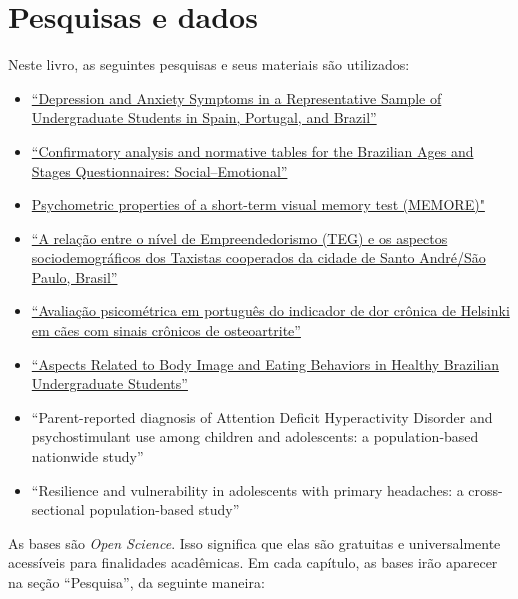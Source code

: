 \documentclass[
]{book}
\begin{document}
\hypertarget{pesquisas-e-dados}{%
\section{Pesquisas e dados}\label{pesquisas-e-dados}}

Neste livro, as seguintes pesquisas e seus materiais são utilizados:

\begin{itemize}
\item
  \href{https://doi.org/10.1590/0102.3772e36412}{``Depression and Anxiety Symptoms in a Representative Sample of Undergraduate Students in Spain, Portugal, and Brazil''}
\item
  \href{https://onlinelibrary.wiley.com/doi/abs/10.1111/cch.12649}{``Confirmatory analysis and normative tables for the Brazilian Ages and Stages Questionnaires: Social--Emotional''}
\item
  \href{https://www.neuropsicolatina.org/index.php/Neuropsicologia_Latinoamericana/article/view/545}{Psychometric properties of a short-term visual memory test (MEMORE)"}
\item
  \href{https://www.metodista.br/revistas/revistas-metodista/index.php/REGS/article/view/6453}{``A relação entre o nível de Empreendedorismo (TEG) e os aspectos sociodemográficos dos Taxistas cooperados da cidade de Santo André/São Paulo, Brasil''}
\item
  \href{https://www.scielo.br/scielo.php?script=sci_arttext\&pid=S0102-09352019000100109}{``Avaliação psicométrica em português do indicador de dor crônica de Helsinki em cães com sinais crônicos de osteoartrite''}
\item
  \href{https://www.researchgate.net/publication/323729370_Aspects_Related_to_Body_Image_and_Eating_Behaviors_in_Healthy_Brazilian_Undergraduate_Students}{``Aspects Related to Body Image and Eating Behaviors in Healthy Brazilian Undergraduate Students''}
\item
  ``Parent-reported diagnosis of Attention Deficit Hyperactivity Disorder and psychostimulant use among children and adolescents: a population-based nationwide study''
\item
  ``Resilience and vulnerability in adolescents with primary headaches: a cross-sectional population-based study''
\end{itemize}

As bases são \emph{Open Science}. Isso significa que elas são gratuitas e universalmente acessíveis para finalidades acadêmicas. Em cada capítulo, as bases irão aparecer na seção ``Pesquisa'', da seguinte maneira:
\end{document}
